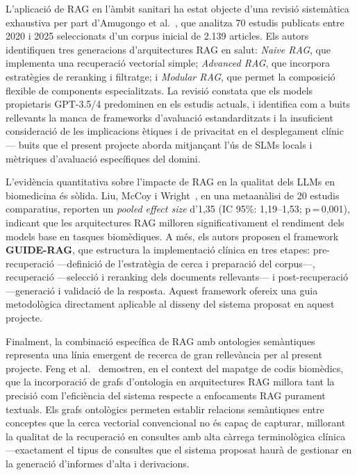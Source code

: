\documentclass[CAT]{TFUOC}%
\begin{document}
L'aplicació de RAG en l'àmbit sanitari ha estat objecte d'una revisió sistemàtica exhaustiva per part d'Amugongo et al.~\cite{amugongo2025rag}, que analitza 70 estudis publicats entre 2020 i 2025 seleccionats d'un corpus inicial de 2.139 articles. Els autors identifiquen tres generacions d'arquitectures RAG en salut: \textit{Naive RAG}, que implementa una recuperació vectorial simple; \textit{Advanced RAG}, que incorpora estratègies de reranking i filtratge; i \textit{Modular RAG}, que permet la composició flexible de components especialitzats. La revisió constata que els models propietaris GPT-3.5/4 predominen en els estudis actuals, i identifica com a buits rellevants la manca de frameworks d'avaluació estandarditzats i la insuficient consideració de les implicacions ètiques i de privacitat en el desplegament clínic --- buits que el present projecte aborda mitjançant l'ús de SLMs locals i mètriques d'avaluació específiques del domini.

L'evidència quantitativa sobre l'impacte de RAG en la qualitat dels LLMs en biomedicina és sòlida. Liu, McCoy i Wright~\cite{liu2025rag}, en una metaanàlisi de 20 estudis comparatius, reporten un \textit{pooled effect size} d'1,35 (IC 95\%: 1,19--1,53; p\,=\,0,001), indicant que les arquitectures RAG milloren significativament el rendiment dels models base en tasques biomèdiques. A més, els autors proposen el framework \textbf{GUIDE-RAG}, que estructura la implementació clínica en tres etapes: pre-recuperació ---definició de l'estratègia de cerca i preparació del corpus---, recuperació ---selecció i reranking dels documents rellevants--- i post-recuperació ---generació i validació de la resposta. Aquest framework ofereix una guia metodològica directament aplicable al disseny del sistema proposat en aquest projecte.

Finalment, la combinació específica de RAG amb ontologies semàntiques representa una línia emergent de recerca de gran rellevància per al present projecte. Feng et al.~\cite{feng2025ontologyrag} demostren, en el context del mapatge de codis biomèdics, que la incorporació de grafs d'ontologia en arquitectures RAG millora tant la precisió com l'eficiència del sistema respecte a enfocaments RAG purament textuals. Els grafs ontològics permeten establir relacions semàntiques entre conceptes que la cerca vectorial convencional no és capaç de capturar, millorant la qualitat de la recuperació en consultes amb alta càrrega terminològica clínica ---exactament el tipus de consultes que el sistema proposat haurà de gestionar en la generació d'informes d'alta i derivacions.
\end{document}
